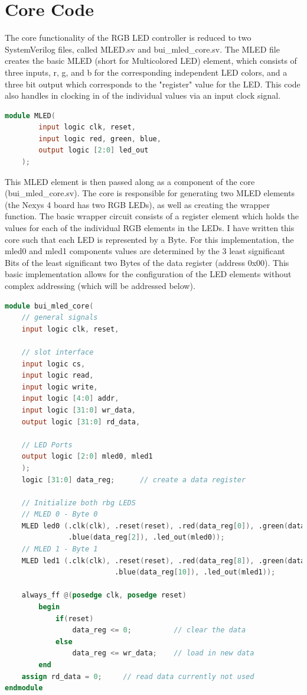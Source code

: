 \documentclass{article}
\begin{document}
\newpage

\section{Core Code}
The core functionality of the RGB LED controller is reduced to two SystemVerilog files, called MLED.sv and bui\_mled\_core.sv. The MLED file creates the basic MLED (short for Multicolored LED) element, which consists of three inputs, r, g, and b for the corresponding independent LED colors, and a three bit output which corresponds to the "register" value for the LED. This code also handles in clocking in of the individual values via an input clock signal.

\begin{lstlisting}[language=Verilog]
module MLED(
        input logic clk, reset,
        input logic red, green, blue,
        output logic [2:0] led_out
    );
\end{lstlisting}

This MLED element is then passed along as a component of the core (bui\_mled\_core.sv). The core is responsible for generating two MLED elements (the Nexys 4 board has two RGB LEDs), as well as creating the wrapper function. The basic wrapper circuit consists of a register element which holds the values for each of the individual RGB elements in the LEDs. I have written this core such that each LED is represented by a Byte. For this implementation, the mled0 and mled1 components values are determined by the 3 least significant Bits of the least significant two Bytes of the data register (address 0x00).  This basic implementation allows for the configuration of the LED elements without complex addressing (which will be addressed below).

\newpage

\begin{lstlisting}[language = Verilog]
module bui_mled_core(
    // general signals
    input logic clk, reset,
    
    // slot interface
    input logic cs,
    input logic read,
    input logic write,
    input logic [4:0] addr,
    input logic [31:0] wr_data,
    output logic [31:0] rd_data,
    
    // LED Ports
    output logic [2:0] mled0, mled1
    );
    logic [31:0] data_reg;      // create a data register
    
    // Initialize both rbg LEDS
    // MLED 0 - Byte 0
    MLED led0 (.clk(clk), .reset(reset), .red(data_reg[0]), .green(data_reg[1]), 
               .blue(data_reg[2]), .led_out(mled0));
    // MLED 1 - Byte 1
    MLED led1 (.clk(clk), .reset(reset), .red(data_reg[8]), .green(data_reg[9]), 
                          .blue(data_reg[10]), .led_out(mled1));
                                         
    always_ff @(posedge clk, posedge reset)
        begin
            if(reset)
                data_reg <= 0;          // clear the data
            else
                data_reg <= wr_data;    // load in new data 
        end  
    assign rd_data = 0;     // read data currently not used 
endmodule
\end{lstlisting}
\end{document}
